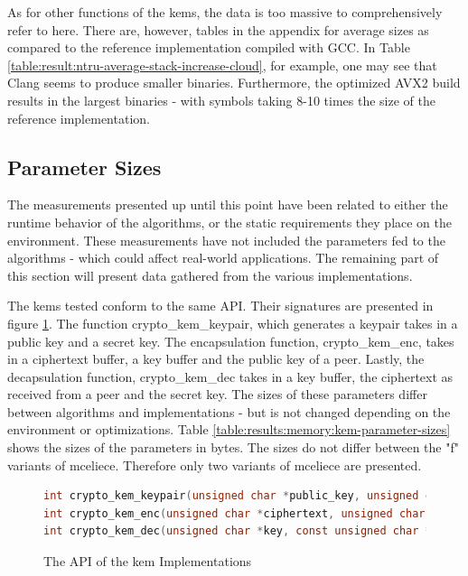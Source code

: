 As for other functions of the \glspl{kem}, the data is too massive to comprehensively refer to here. There are, however, tables in the appendix for average sizes as compared to the reference implementation compiled with GCC. In Table \ref{table:result:ntru-average-stack-increase-cloud}, for example, one may see that Clang seems to produce smaller binaries. Furthermore, the optimized AVX2 build results in the largest binaries - with symbols taking 8-10 times the size of the reference implementation.


\subsection{Parameter Sizes}

The measurements presented up until this point have been related to either the runtime behavior of the algorithms, or the static requirements they place on the environment. These measurements have not included the parameters fed to the algorithms - which could affect real-world applications. The remaining part of this section will present data gathered from the various implementations.

The \glspl{kem} tested conform to the same API. Their signatures are presented in figure \ref{figure:result:memory:kem-api}. The function crypto\_kem\_keypair, which generates a keypair takes in a public key and a secret key. The encapsulation function, crypto\_kem\_enc, takes in a ciphertext buffer, a key buffer and the public key of a peer. Lastly, the decapsulation function, crypto\_kem\_dec takes in a key buffer, the ciphertext as received from a peer and the secret key. The sizes of these parameters differ between algorithms and implementations - but is not changed depending on the environment or optimizations. Table \ref{table:results:memory:kem-parameter-sizes} shows the sizes of the parameters in bytes. The sizes do not differ between the "f" variants of \gls{mceliece}. Therefore only two variants of \gls{mceliece} are presented.

\begin{figure}
    \centering
    \begin{lstlisting}[language=C]
int crypto_kem_keypair(unsigned char *public_key, unsigned char *private_key);
int crypto_kem_enc(unsigned char *ciphertext, unsigned char *key, const unsigned char *public_key);
int crypto_kem_dec(unsigned char *key, const unsigned char *ciphertext, const unsigned char *private_key);
    \end{lstlisting}
    \caption{The API of the \gls{kem} Implementations}
    \label{figure:result:memory:kem-api}
\end{figure}


